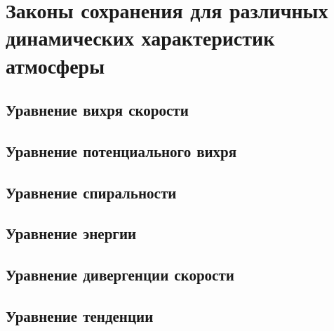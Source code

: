 \chapter{Законы сохранения для различных динамических характеристик атмосферы}

\section{Уравнение вихря скорости}

\section{Уравнение потенциального вихря}

\section{Уравнение спиральности}

\section{Уравнение энергии}

\section{Уравнение дивергенции скорости}

\section{Уравнение тенденции}

